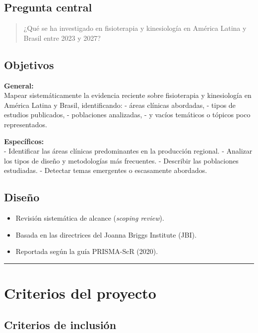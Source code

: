 \documentclass[
  letterpaper,
]{book}
\providecommand{\tightlist}{%
  \setlength{\itemsep}{0pt}\setlength{\parskip}{0pt}}\usepackage{longtable,booktabs,array}
\begin{document}
\subsection{Pregunta central}\label{pregunta-central}

\begin{quote}
¿Qué se ha investigado en fisioterapia y kinesiología en América Latina
y Brasil entre 2023 y 2027?
\end{quote}

\subsection{Objetivos}\label{objetivos}

\textbf{General:}\\
Mapear sistemáticamente la evidencia reciente sobre fisioterapia y
kinesiología en América Latina y Brasil, identificando: - áreas clínicas
abordadas, - tipos de estudios publicados, - poblaciones analizadas, - y
vacíos temáticos o tópicos poco representados.

\textbf{Específicos:}\\
- Identificar las áreas clínicas predominantes en la producción
regional. - Analizar los tipos de diseño y metodologías más frecuentes.
- Describir las poblaciones estudiadas. - Detectar temas emergentes o
escasamente abordados.

\subsection{Diseño}\label{diseuxf1o}

\begin{itemize}
\tightlist
\item
  Revisión sistemática de alcance (\emph{scoping review}).
\item
  Basada en las directrices del Joanna Briggs Institute (JBI).
\item
  Reportada según la guía PRISMA-ScR (2020).
\end{itemize}

\begin{center}\rule{0.5\linewidth}{0.5pt}\end{center}

\section{Criterios del proyecto}\label{criterios-del-proyecto}

\subsection{Criterios de inclusión}\label{criterios-de-inclusiuxf3n}
\end{document}
